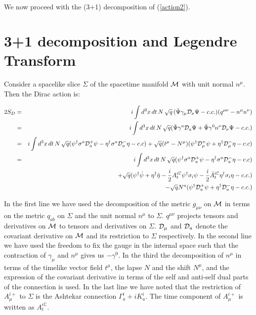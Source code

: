 \begin{doublespace}
We now proceed with the (3+1) decomposition of (\ref{action2}).

\section{3+1 decomposition and Legendre Transform}

Consider a spacelike slice $\Sigma$ of the spacetime manifold ${\cal M}$ with unit normal
$n^{\mu}$. Then the Dirac action is:

\begin{eqnarray}\label{dirac_decomp}
    2S_{D} & = & i\int d^{3}x\,dt\,N\,\sqrt{q}\,
    (\bar{\Psi}\gamma_{\mu}{\cal D}_{\nu}\Psi - c.c.)(q^{\mu\nu}-n^{\mu}n^{\nu})\nonumber \\
    & = & i\int d^{3}x\,dt\,N\,\sqrt{q}
    (\bar{\Psi}\gamma^{a}{\cal D}_{a}\Psi + \bar{\Psi}\gamma^0n^{\nu}{\cal D}_{\nu}\Psi - c.c.)\nonumber \\
    & = & i\int d^{3}x\,dt\,N\,\sqrt{q}
    (\psi^\dag\sigma^{a}{\cal D}_{a}^{+}\psi - \eta^\dag\sigma^{a}{\cal D}_{a}^{-}\eta - c.c)
    +\sqrt{q}(t^{\mu}-N^{\mu})(\psi^\dag {\cal D}_{\mu}^{+}\psi + \eta^\dag {\cal D}_{\mu}^{-}\eta -
    c.c) \nonumber \\
    & = & i\int d^{3}x\,dt\,N\,\sqrt{q}
    (\psi^\dag\sigma^{a}{\cal D}_{a}^{+}\psi - \eta^\dag\sigma^{a}{\cal D}_{a}^{-}\eta - c.c) \nonumber \\
    &&+ \sqrt{q}(\psi^\dag\dot{\psi} + \eta^\dag\dot{\eta} -
    \frac{i}{2}A_t^{i\mathbb{C}}\psi^\dag\sigma_i\psi -
    \frac{i}{2}\bar{A}_t^{i\mathbb{C}}\eta^\dag\sigma_i\eta - c.c.) \nonumber \\
    &&- \sqrt{q}N^a(\psi^\dag {\cal D}_a^+\psi + \eta^\dag {\cal D}_a^-\eta - c.c.)
\end{eqnarray}

In the first line we have used the decomposition of the metric $g_{\mu\nu}$ on ${\cal M}$ in terms
on the metric $q_{ab}$ on $\Sigma$ and the unit normal $n^{\mu}$ to $\Sigma$. $q^{\mu\nu}$ projects
tensors and derivatives on ${\cal M}$ to tensors and derivatives on $\Sigma$. ${\cal D}_{\mu}$ and
${\cal D}_{a}$ denote the covariant derivative on ${\cal M}$ and its restriction to $\Sigma$
respectively. In the second line we have used the freedom to fix the gauge in the internal space
such that the contraction of $\gamma_{\mu}$ and $n^{\mu}$ gives us $-\gamma^{0}$. In the third the
decomposition of $n^{\mu}$ in terms of the timelike vector field $t^{\mu}$, the lapse $N$ and the
shift $N^{\mu}$, and the expression of the covariant derivative in terms of the self and anti-self
dual parts of the connection is used. In the last line we have noted that the restriction of
$A_\mu^{i+}$ to $\Sigma$ is the Ashtekar connection $\Gamma_a^i + iK_a^i$. The time component of
$A_\mu^{i+}$ is written as $A_t^{i\mathbb{C}}$.


\end{doublespace}
